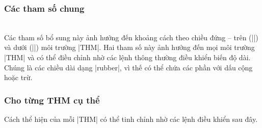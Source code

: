 \documentclass[11pt,oneside]{ltxdoc}
\theoremstyle{marginbreak}
\theoremstyle{changebreak}
\theoremstyle{change}
\theoremstyle{plain}
\theoremstyle{nonumberplain}
\begin{document}

\subsubsection{Các tham số chung}

\DescribeMacro\theorempreskipamount
\DescribeMacro\theorempostskipamount
{} \\ 
Các tham số bổ sung này ảnh hưởng đến khoảng cách theo chiều đứng --
trên (|\theorempreskipamount|) và dưới (|\theorempostskipamount|) môi trường |THM|.
Hai tham số này ảnh hưởng đến mọi môi trường |THM| và có thể điều chỉnh
nhờ các lệnh thông thường điều khiển biến độ dài. Chúng là các chiều dài
dạng |rubber|, vì thế có thể chứa các phần với dấu cộng hoặc trừ.

\subsubsection{Cho từng THM cụ thể}

Cách thể hiện của mỗi |THM| có thể tinh chỉnh nhờ các lệnh điều khiển sau đây.
\end{document}
